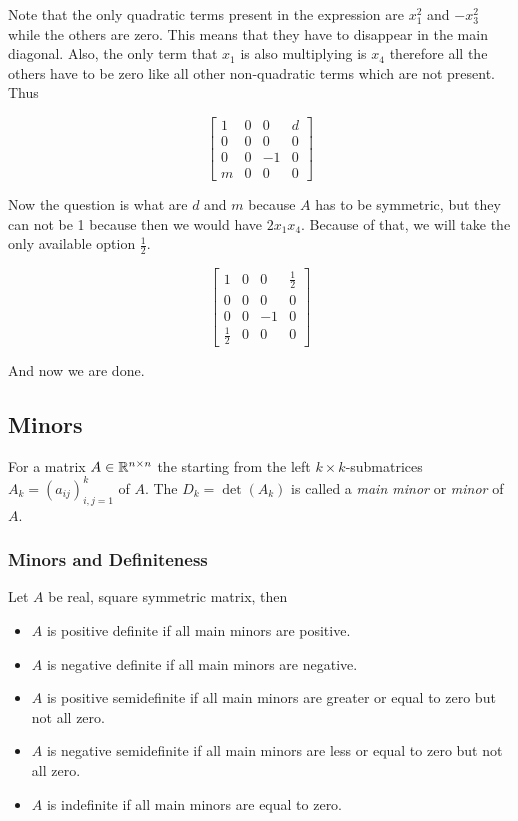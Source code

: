 Note that the only quadratic terms present in the expression are \(x_{1}^{2}\) and \(-x_{3}^{2}\) while the 
others are zero. This means that they have to disappear in the main diagonal. Also, the only term 
that \(x_1\) is also multiplying is \(x_4\) therefore all the others have to be zero like all 
other non-quadratic terms which are not present. Thus 

\[
    \begin{bmatrix}
        1 & 0 & 0 & d \\
        0 & 0 & 0 & 0 \\
        0 & 0 & -1 & 0 \\
        m & 0 & 0 & 0  
    \end{bmatrix}
\]

Now the question is what are \(d\) and \(m\) because \(A\) has to be symmetric, but they can not be 1 
because then we would have \(2x_1 x_4\). Because of that, we will take the only available option 
\(\frac{1}{2}\).

\[
    \begin{bmatrix}
        1 & 0 & 0 & \frac{1}{2} \\
        0 & 0 & 0 & 0 \\
        0 & 0 & -1 & 0 \\
        \frac{1}{2} & 0 & 0 & 0  
    \end{bmatrix}
\]

And now we are done.

\subsection{Minors}

For a matrix \(A \in \mathbb{R}^{n \times n}\) the starting from the left \(k \times k\)-submatrices 
\(A_k = (a_{ij})_{i,j=1}^{k}\) of \(A\). The \(D_k  = \det(A_k)\) is called a \emph{main minor} or 
\emph{minor} of \(A\).

\subsubsection{Minors and Definiteness}

Let \(A\) be real, square symmetric matrix, then

\begin{itemize}
    
    \item \(A\) is positive definite if all main minors are positive.

    \item \(A\) is negative definite if all main minors are negative.

    \item \(A\) is positive semidefinite if all main minors are greater or equal to zero but not all zero. 

    \item \(A\) is negative semidefinite if all main minors are less or equal to zero but not all zero.

    \item \(A\) is indefinite if all main minors are equal to zero.

\end{itemize}

